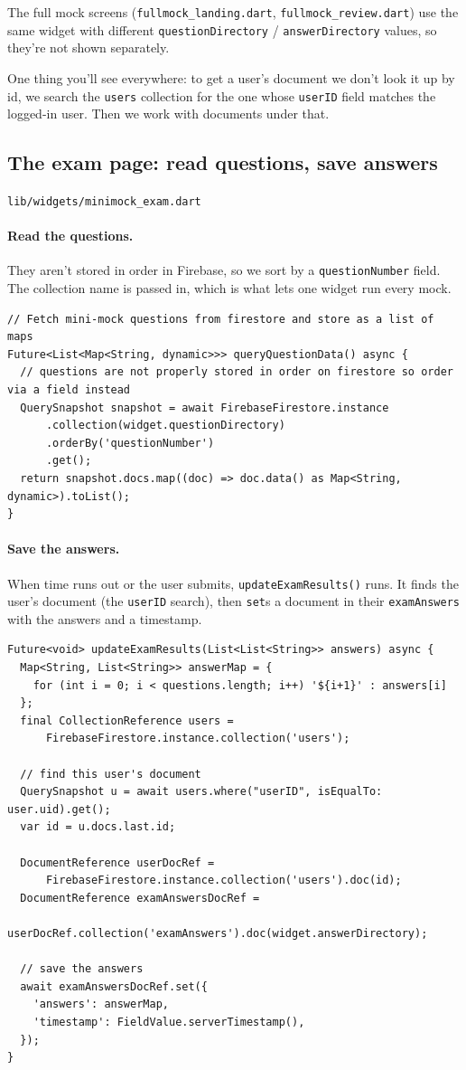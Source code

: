 \documentclass[11pt,a4paper]{article}
\newcommand{\file}[1]{\texttt{\small #1}}
\begin{document}
\noindent The full mock screens (\file{fullmock\_landing.dart},
\file{fullmock\_review.dart}) use the same widget with different
\verb|questionDirectory| / \verb|answerDirectory| values, so they're not shown
separately.

One thing you'll see everywhere: to get a user's document we don't look it up by
id, we search the \texttt{users} collection for the one whose \texttt{userID}
field matches the logged-in user. Then we work with documents under that.

\subsection{The exam page: read questions, save answers}
\file{lib/widgets/minimock\_exam.dart}

\paragraph{Read the questions.} They aren't stored in order in Firebase, so we
sort by a \verb|questionNumber| field. The collection name is passed in, which
is what lets one widget run every mock.

\begin{lstlisting}
// Fetch mini-mock questions from firestore and store as a list of maps
Future<List<Map<String, dynamic>>> queryQuestionData() async {
  // questions are not properly stored in order on firestore so order via a field instead
  QuerySnapshot snapshot = await FirebaseFirestore.instance
      .collection(widget.questionDirectory)
      .orderBy('questionNumber')
      .get();
  return snapshot.docs.map((doc) => doc.data() as Map<String, dynamic>).toList();
}
\end{lstlisting}

\paragraph{Save the answers.} When time runs out or the user submits,
\verb|updateExamResults()| runs. It finds the user's document (the
\texttt{userID} search), then \verb|set|s a document in their \texttt{examAnswers}
with the answers and a timestamp.

\begin{lstlisting}
Future<void> updateExamResults(List<List<String>> answers) async {
  Map<String, List<String>> answerMap = {
    for (int i = 0; i < questions.length; i++) '${i+1}' : answers[i]
  };
  final CollectionReference users =
      FirebaseFirestore.instance.collection('users');

  // find this user's document
  QuerySnapshot u = await users.where("userID", isEqualTo: user.uid).get();
  var id = u.docs.last.id;

  DocumentReference userDocRef =
      FirebaseFirestore.instance.collection('users').doc(id);
  DocumentReference examAnswersDocRef =
      userDocRef.collection('examAnswers').doc(widget.answerDirectory);

  // save the answers
  await examAnswersDocRef.set({
    'answers': answerMap,
    'timestamp': FieldValue.serverTimestamp(),
  });
}
\end{lstlisting}
\end{document}
